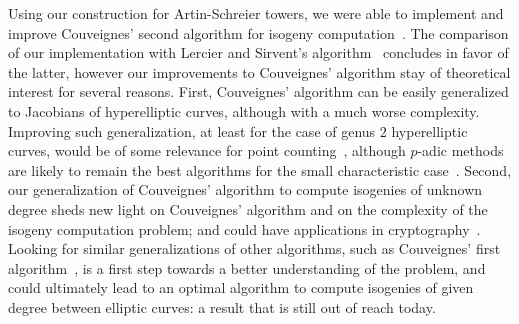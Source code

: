 Using our construction for Artin-Schreier towers, we were able to
implement and improve Couveignes' second algorithm for isogeny
computation~\cite{couveignes96}. The comparison of our implementation
with Lercier and Sirvent's algorithm~\cite{lercier+sirvent08}
concludes in favor of the latter, however our improvements to
Couveignes' algorithm stay of theoretical interest for several
reasons. First, Couveignes' algorithm can be easily generalized to
Jacobians of hyperelliptic curves, although with a much worse
complexity. Improving such generalization, at least for the case of
genus $2$ hyperelliptic curves, would be of some relevance for point
counting~\cite{schoof95,pila90,gaudry+schost04}, although $p$-adic
methods are likely to remain the best algorithms for the small
characteristic case~\cite{kedlaya01,denef+vercauteren06}. Second, our
generalization of Couveignes' algorithm to compute isogenies of
unknown degree sheds new light on Couveignes' algorithm and on the
complexity of the isogeny computation problem; and could have
applications in cryptography~\cite{teske06,rostovtsev+stolbunov06}.
Looking for similar generalizations of other algorithms, such as
Couveignes' first algorithm~\cite{couveignes94}, is a first step
towards a better understanding of the problem, and could ultimately
lead to an optimal algorithm to compute isogenies of given degree
between elliptic curves: a result that is still out of reach today.


